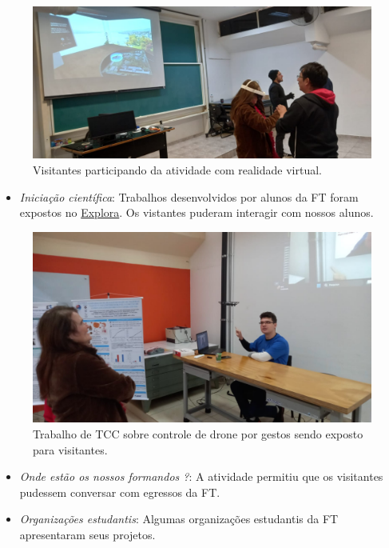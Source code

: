 \documentclass[
  letterpaper,
  DIV=11,
  numbers=noendperiod]{scrreprt}
\providecommand{\tightlist}{%
  \setlength{\itemsep}{0pt}\setlength{\parskip}{0pt}}\usepackage{longtable,booktabs,array}
\begin{document}
\begin{figure}[H]

{\centering \includegraphics[width=0.8\linewidth,height=\textheight,keepaspectratio]{planejamento/RV-2.jpeg}

}

\caption{Visitantes participando da atividade com realidade virtual.}

\end{figure}%

\begin{itemize}
\tightlist
\item
  \emph{Iniciação científica}: Trabalhos desenvolvidos por alunos da FT
  foram expostos no \href{https://explora.ft.unicamp.br/}{Explora}. Os
  vistantes puderam interagir com nossos alunos.
\end{itemize}

\begin{figure}[H]

{\centering \includegraphics[width=0.8\linewidth,height=\textheight,keepaspectratio]{planejamento/IC-1.jpeg}

}

\caption{Trabalho de TCC sobre controle de drone por gestos sendo
exposto para visitantes.}

\end{figure}%

\begin{itemize}
\item
  \emph{Onde estão os nossos formandos ?}: A atividade permitiu que os
  visitantes pudessem conversar com egressos da FT.
\item
  \emph{Organizações estudantis}: Algumas organizações estudantis da FT
  apresentaram seus projetos.
\end{itemize}
\end{document}
